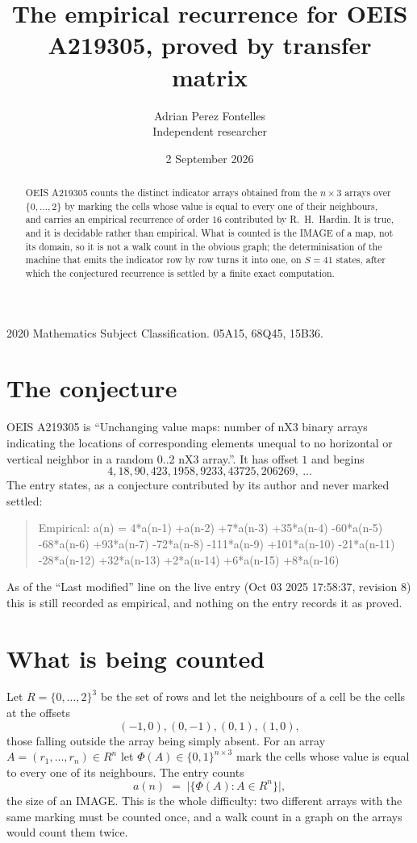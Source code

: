 \documentclass[11pt,a4paper]{article}
\title{The empirical recurrence for OEIS A219305, proved by transfer matrix}
\author{Adrian Perez Fontelles\\ \small Independent researcher}
\date{2 September 2026}
\theoremstyle{plain}
\theoremstyle{definition}
\begin{document}
\maketitle

\begin{abstract}
OEIS A219305 counts the distinct indicator arrays obtained from the $n\times3$ arrays over
$\{0,\dots,2\}$ by marking the cells whose value is equal to every one of their neighbours, and carries an
empirical recurrence of order $16$ contributed by R.~H.~Hardin. It is true, and it is
decidable rather than empirical. What is counted is the IMAGE of a map, not its domain, so it
is not a walk count in the obvious graph; the determinisation of the machine that emits the
indicator row by row turns it into one, on $S=41$ states, after which the conjectured
recurrence is settled by a finite exact computation.
\end{abstract}

\noindent\small 2020 Mathematics Subject Classification. 05A15, 68Q45, 15B36.\normalsize

\section{The conjecture}

OEIS A219305 is ``Unchanging value maps: number of nX3 binary arrays indicating the locations of corresponding elements unequal to no horizontal or vertical neighbor in a random 0..2 nX3 array.''. It has offset $1$ and begins
\[
4, 18, 90, 423, 1958, 9233, 43725, 206269,\ \dots
\]
The entry states, as a conjecture contributed by its author and never marked settled:
\begin{quote}
Empirical: a(n) = 4*a(n-1) +a(n-2) +7*a(n-3) +35*a(n-4) -60*a(n-5) -68*a(n-6) +93*a(n-7) -72*a(n-8) -111*a(n-9) +101*a(n-10) -21*a(n-11) -28*a(n-12) +32*a(n-13) +2*a(n-14) +6*a(n-15) +8*a(n-16)
\end{quote}
As of the ``Last modified'' line on the live entry (Oct 03 2025 17:58:37, revision 8) this is still
recorded as empirical, and nothing on the entry records it as proved.

\section{What is being counted}

Let $R=\{0,\dots,2\}^{3}$ be the set of rows and let the neighbours of a cell be the
cells at the offsets
\[
(-1,0), (0,-1), (0,1), (1,0),
\]
those falling outside the array being simply absent. For an array
$A=(r_1,\dots,r_n)\in R^n$ let $\Phi(A)\in\{0,1\}^{n\times3}$ mark the cells whose value
is equal to every one of its neighbours. The entry counts
\[
a(n)\;=\;\bigl|\{\Phi(A):A\in R^n\}\bigr| ,
\]
the size of an IMAGE. This is the whole difficulty: two different arrays with the same marking
must be counted once, and a walk count in a graph on the arrays would count them twice.
\end{document}

